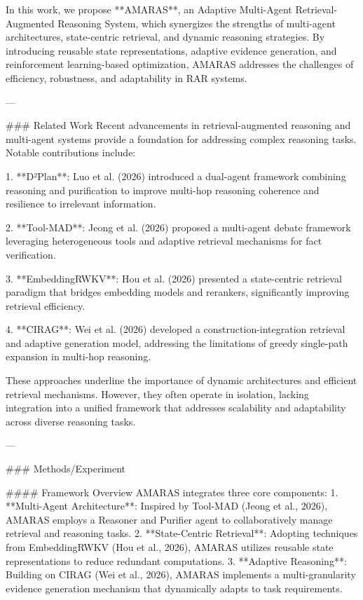 In this work, we propose **AMARAS**, an Adaptive Multi-Agent Retrieval-Augmented Reasoning System, which synergizes the strengths of multi-agent architectures, state-centric retrieval, and dynamic reasoning strategies. By introducing reusable state representations, adaptive evidence generation, and reinforcement learning-based optimization, AMARAS addresses the challenges of efficiency, robustness, and adaptability in RAR systems.

---

### Related Work
Recent advancements in retrieval-augmented reasoning and multi-agent systems provide a foundation for addressing complex reasoning tasks. Notable contributions include:

1. **D²Plan**: Luo et al. (2026) introduced a dual-agent framework combining reasoning and purification to improve multi-hop reasoning coherence and resilience to irrelevant information.

2. **Tool-MAD**: Jeong et al. (2026) proposed a multi-agent debate framework leveraging heterogeneous tools and adaptive retrieval mechanisms for fact verification.

3. **EmbeddingRWKV**: Hou et al. (2026) presented a state-centric retrieval paradigm that bridges embedding models and rerankers, significantly improving retrieval efficiency.

4. **CIRAG**: Wei et al. (2026) developed a construction-integration retrieval and adaptive generation model, addressing the limitations of greedy single-path expansion in multi-hop reasoning.

These approaches underline the importance of dynamic architectures and efficient retrieval mechanisms. However, they often operate in isolation, lacking integration into a unified framework that addresses scalability and adaptability across diverse reasoning tasks.

---

### Methods/Experiment

#### Framework Overview
AMARAS integrates three core components:
1. **Multi-Agent Architecture**: Inspired by Tool-MAD (Jeong et al., 2026), AMARAS employs a Reasoner and Purifier agent to collaboratively manage retrieval and reasoning tasks.
2. **State-Centric Retrieval**: Adopting techniques from EmbeddingRWKV (Hou et al., 2026), AMARAS utilizes reusable state representations to reduce redundant computations.
3. **Adaptive Reasoning**: Building on CIRAG (Wei et al., 2026), AMARAS implements a multi-granularity evidence generation mechanism that dynamically adapts to task requirements.

